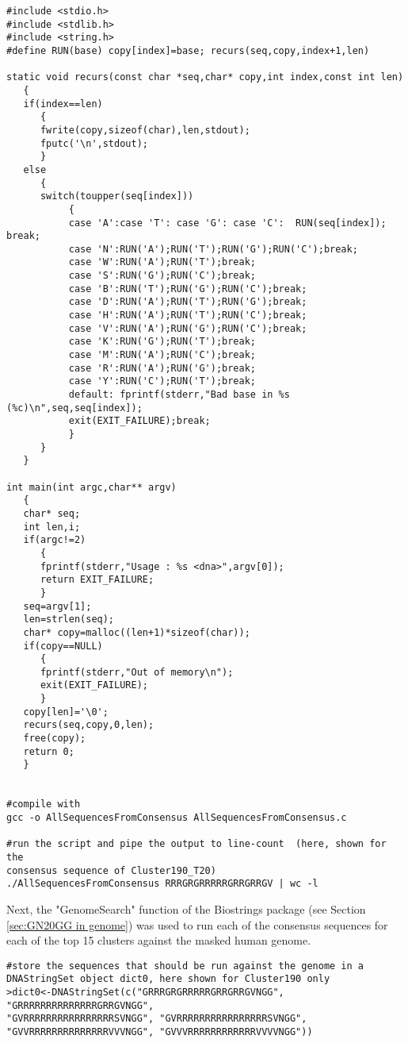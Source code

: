 \begin{footnotesize}
\begin{lstlisting}
#include <stdio.h>
#include <stdlib.h>
#include <string.h>
#define RUN(base) copy[index]=base; recurs(seq,copy,index+1,len)

static void recurs(const char *seq,char* copy,int index,const int len)
   {
   if(index==len)
      {
      fwrite(copy,sizeof(char),len,stdout);
      fputc('\n',stdout);
      }
   else
      {
      switch(toupper(seq[index]))
           {
           case 'A':case 'T': case 'G': case 'C':  RUN(seq[index]); break;
           case 'N':RUN('A');RUN('T');RUN('G');RUN('C');break;
           case 'W':RUN('A');RUN('T');break;
           case 'S':RUN('G');RUN('C');break;
           case 'B':RUN('T');RUN('G');RUN('C');break;
           case 'D':RUN('A');RUN('T');RUN('G');break;
           case 'H':RUN('A');RUN('T');RUN('C');break;
           case 'V':RUN('A');RUN('G');RUN('C');break;
           case 'K':RUN('G');RUN('T');break;
           case 'M':RUN('A');RUN('C');break;
           case 'R':RUN('A');RUN('G');break;
           case 'Y':RUN('C');RUN('T');break;
           default: fprintf(stderr,"Bad base in %s (%c)\n",seq,seq[index]);
           exit(EXIT_FAILURE);break;
           }
      }
   }

int main(int argc,char** argv)
   {
   char* seq;
   int len,i;
   if(argc!=2)
      {
      fprintf(stderr,"Usage : %s <dna>",argv[0]);
      return EXIT_FAILURE;
      }
   seq=argv[1];
   len=strlen(seq);
   char* copy=malloc((len+1)*sizeof(char));
   if(copy==NULL)
      {
      fprintf(stderr,"Out of memory\n");
      exit(EXIT_FAILURE);
      }
   copy[len]='\0';
   recurs(seq,copy,0,len);
   free(copy);
   return 0;
   }


#compile with
gcc -o AllSequencesFromConsensus AllSequencesFromConsensus.c

#run the script and pipe the output to line-count  (here, shown for the 
consensus sequence of Cluster190_T20)
./AllSequencesFromConsensus RRRGRGRRRRRGRRGRRGV | wc -l
\end{lstlisting}

Next, the "GenomeSearch" function of the Biostrings package (see Section \ref{sec:GN20GG in genome}) was used to run each of the consensus sequences for each of the top 15 clusters against the masked human genome. 

\begin{lstlisting}
#store the sequences that should be run against the genome in a
DNAStringSet object dict0, here shown for Cluster190 only
>dict0<-DNAStringSet(c("GRRRGRGRRRRRGRRGRRGVNGG", "GRRRRRRRRRRRRRRGRRGVNGG",
"GVRRRRRRRRRRRRRRRRSVNGG", "GVRRRRRRRRRRRRRRRRSVNGG",
"GVVRRRRRRRRRRRRRRVVVNGG", "GVVVRRRRRRRRRRRRVVVVNGG"))


\end{lstlisting}
\end{footnotesize}
